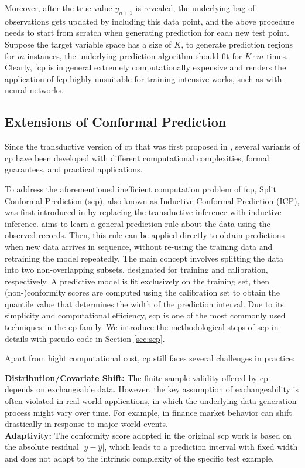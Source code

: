 \documentclass[a4paper,oneside,bibliography=totoc]{scrbook}
\begin{document}
Moreover, after the true value $y_{n+1}$ is revealed, the underlying bag of observations gets updated by including this data point, and the above procedure needs to start from scratch when generating prediction for each new test point. Suppose the target variable space has a size of $K$, to generate prediction regions for $m$ instances, the underlying prediction algorithm should fit for $K \cdot m$ times. Clearly, \gls{fcp} is in general extremely computationally expensive and renders the application of \gls{fcp} highly unsuitable for training-intensive works, such as with neural networks.

\subsection{Extensions of Conformal Prediction}
Since the transductive version of \gls{cp} that was first proposed in \cite{gammerman1998learning}, several variants of \gls{cp} have been developed with different computational complexities, formal guarantees, and practical applications.

To address the aforementioned inefficient computation problem of \gls{fcp}, Split Conformal Prediction (\gls{scp}), also known as Inductive Conformal Prediction (ICP), was first introduced in \cite{papadopoulos2002inductive} by replacing the transductive inference with inductive inference.  aims to learn a general prediction rule about the data using the observed records. Then, this rule can be applied directly to obtain predictions when new data arrives in sequence, without re-using the training data and retraining the model repeatedly. The main concept involves splitting the data into two non-overlapping subsets, designated for training and calibration, respectively. A predictive model is fit exclusively on the training set, then (non-)conformity scores are computed using the calibration set to obtain the quantile value that determines the width of the prediction interval. Due to its simplicity and computational efficiency, \gls{scp} is one of the most commonly used techniques in the \gls{cp} family. We introduce the methodological steps of \gls{scp} in details with pseudo-code in Section \ref{sec:scp}.

\vspace{0.5em} 	
Apart from hight computational cost, \gls{cp} still faces several challenges in practice: 
\vspace{0.2em} 

\noindent \textbf{Distribution/Covariate Shift:} The finite-sample validity offered by \gls{cp} depends on exchangeable data. However, the key assumption of exchangeability is often violated in real-world applications, in which the underlying data generation process might vary over time. For example, in finance market behavior can shift drastically in response to major world events. \\
 \noindent \textbf{Adaptivity:} The conformity score adopted in the original \gls{scp} work is based on the  absolute residual $|y - \hat{y}|$, which leads to a prediction interval with fixed width and does not adapt to the intrinsic complexity of the specific test example.
  
\end{document}
